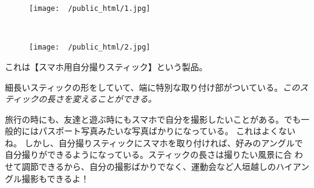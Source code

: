 \documentclass[10pt]{book}
\begin{document}
\begin{figure}[H]
        \centering
        \begin{subfloat}{}
                {\texttt{[image: ~/public\_html/1.jpg]}}
        \end{subfloat}~
        \begin{subfloat}{}
                {\texttt{[image: ~/public\_html/2.jpg]}}
        \end{subfloat}
\end{figure}\vspace{1in}
これは【スマホ用自分撮りスティック】という製品。\\\newline

細長いスティックの形をしていて、端に特別な取り付け部がついている。{\it このスティックの長さを変えることができる。}\\\newline

旅行の時にも、友達と遊ぶ時にもスマホで自分を撮影したいことがある。でも一般的にはパスポート写真みたいな写真ばかりになっている。
これはよくないね。
しかし、自分撮りスティックにスマホを取り付ければ、好みのアングルで自分撮りができるようになっている。スティックの長さは撮りたい風景に合
わせて調節できるから、自分の撮影ばかりでなく、運動会など人垣越しのハイアングル撮影もできるよ！
\end{document}
